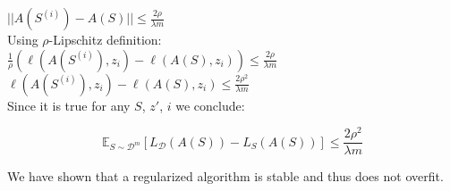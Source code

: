 $|| A(S^{(i)}) - A(S) || \leq \frac{2 \rho}{\lambda m}$ \\

Using $\rho$-Lipschitz definition: \\

$\frac{1}{\rho}(\ell(A(S^{(i)}), z_i) - \ell(A(S), z_i)) \leq \frac{2 \rho}{\lambda m}$ \\

$\ell(A(S^{(i)}), z_i) - \ell(A(S), z_i) \leq \frac{2 \rho^2}{\lambda m}$ \\

Since it is true for any $S$, $z'$, $i$ we conclude:

$$\mathbb{E}_{S \sim \mathcal{D}^m}[L_{\mathcal{D}}(A(S)) - L_S(A(S))] \leq \frac{2 \rho^2}{\lambda m}$$

We have shown that a regularized algorithm is stable and thus does not overfit.

\vspace{5mm}